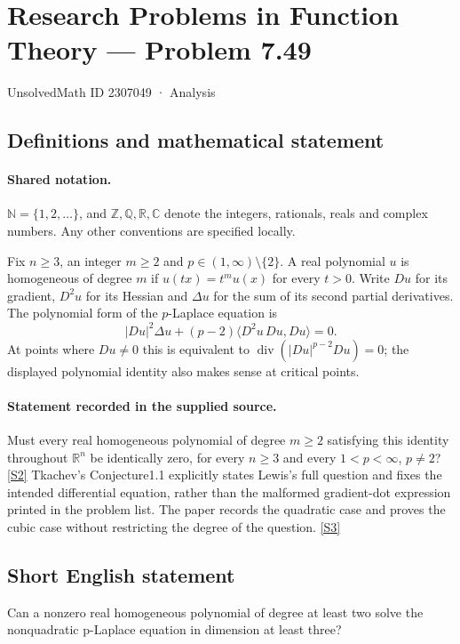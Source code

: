 \documentclass[11pt]{article}
\newcommand{\sref}[2]{\hyperlink{source:#1:#2}{[S#2]}}
\begin{document}
\setcounter{section}{2307048}
\section{Research Problems in Function Theory — Problem 7.49}\label{2307049}
{\small\sffamily UnsolvedMath ID 2307049 · Analysis}
\subsection{Definitions and mathematical statement}

\paragraph{Shared notation.}$\mathbb N=\{1,2,\ldots\}$, and $\mathbb Z,\mathbb Q,\mathbb R,\mathbb C$ denote the integers, rationals, reals and complex numbers. Any other conventions are specified locally.


Fix $n\ge3$, an integer $m\ge2$ and $p\in(1,\infty)\setminus\{2\}$. A real polynomial $u$ is homogeneous of degree $m$ if $u(tx)=t^m u(x)$ for every $t>0$. Write $Du$ for its gradient, $D^2u$ for its Hessian and $\Delta u$ for the sum of its second partial derivatives. The polynomial form of the $p$-Laplace equation is
\[|Du|^2\Delta u+(p-2)\langle D^2u\,Du,Du\rangle=0.\]
At points where $Du\ne0$ this is equivalent to $\operatorname{div}(|Du|^{p-2}Du)=0$; the displayed polynomial identity also makes sense at critical points.

\paragraph{Statement recorded in the supplied source.}
Must every real homogeneous polynomial of degree $m\ge2$ satisfying this identity throughout $\mathbb R^n$ be identically zero, for every $n\ge3$ and every $1<p<\infty$, $p\ne2$? \sref{2307049}{2}
Tkachev's Conjecture1.1 explicitly states Lewis's full question and fixes the intended differential equation, rather than the malformed gradient-dot expression printed in the problem list. The paper records the quadratic case and proves the cubic case without restricting the degree of the question. \sref{2307049}{3}
\subsection{Short English statement}
Can a nonzero real homogeneous polynomial of degree at least two solve the nonquadratic p-Laplace equation in dimension at least three?
\end{document}
